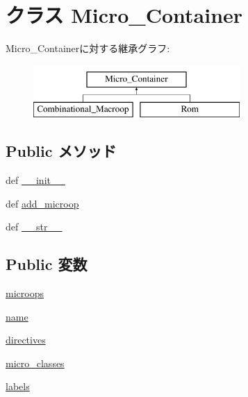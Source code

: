 \hypertarget{classmicro__asm_1_1Micro__Container}{
\section{クラス Micro\_\-Container}
\label{classmicro__asm_1_1Micro__Container}
}
Micro\_\-Containerに対する継承グラフ:\begin{figure}[H]
\begin{center}
\leavevmode
\includegraphics[height=2cm]{classmicro__asm_1_1Micro__Container}
\end{center}
\end{figure}
\subsection*{Public メソッド}
\begin{DoxyCompactItemize}
\item 
def \hyperlink{classmicro__asm_1_1Micro__Container_ac775ee34451fdfa742b318538164070e}{\_\-\_\-init\_\-\_\-}
\item 
def \hyperlink{classmicro__asm_1_1Micro__Container_a123ef44f557360cbb23e994b58608bd8}{add\_\-microop}
\item 
def \hyperlink{classmicro__asm_1_1Micro__Container_aa7a4b9bc0941308e362738503137460e}{\_\-\_\-str\_\-\_\-}
\end{DoxyCompactItemize}
\subsection*{Public 変数}
\begin{DoxyCompactItemize}
\item 
\hyperlink{classmicro__asm_1_1Micro__Container_ab5f4735aada47d9e1fa56b5ebbb81774}{microops}
\item 
\hyperlink{classmicro__asm_1_1Micro__Container_ab74e6bf80237ddc4109968cedc58c151}{name}
\item 
\hyperlink{classmicro__asm_1_1Micro__Container_a6b7cf57f95798ede8f3b8f2c4100f7c3}{directives}
\item 
\hyperlink{classmicro__asm_1_1Micro__Container_ac1b0f9ae59df9c9b472d0209d45e7f32}{micro\_\-classes}
\item 
\hyperlink{classmicro__asm_1_1Micro__Container_abc325fc13d4194905c1786e24ee447f0}{labels}
\end{DoxyCompactItemize}


